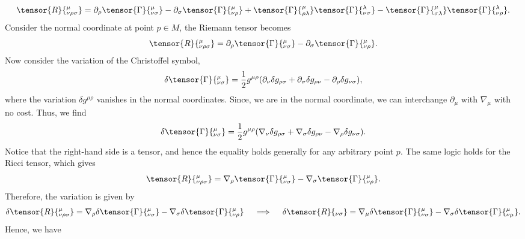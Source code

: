 \begin{solution}
    \begin{equation}
        \tensor{R}{^\mu_{\nu\rho\sigma}} = \partial_\rho\tensor{\Gamma}{^\mu_{\nu\sigma}}
    - \partial_\sigma\tensor{\Gamma}{^\mu_{\nu\rho}}
    + \tensor{\Gamma}{^\mu_{\rho\lambda}}\tensor{\Gamma}{^\lambda_{\nu\sigma}}
    - \tensor{\Gamma}{^\mu_{\sigma\lambda}}\tensor{\Gamma}{^\lambda_{\nu\rho}}.
    \end{equation}
    Consider the normal coordinate at point $p\in M$, the Riemann tensor becomes
    \begin{equation}
        \tensor{R}{^\mu_{\nu\rho\sigma}} = \partial_\rho\tensor{\Gamma}{^\mu_{\nu\sigma}}
    - \partial_\sigma\tensor{\Gamma}{^\mu_{\nu\rho}}.
    \end{equation}
    Now consider the variation of the Christoffel symbol, 
    \begin{equation}
        \delta \tensor{\Gamma}{^\mu_{\nu\sigma}} = \frac{1}{2}g^{\mu\rho}(\partial_\nu\delta g_{\rho\sigma} +\partial_\sigma\delta g_{\rho\nu} - \partial_\rho\delta g_{\nu\sigma}),
    \end{equation}
    where the variation $\delta g^{\mu\rho}$ vanishes in the normal coordinates. Since, we are in the normal coordinate, we can interchange $\partial_\mu$ with $\nabla_\mu$ with no cost. Thus, we find
    \begin{equation}
        \delta \tensor{\Gamma}{^\mu_{\nu\sigma}} = \frac{1}{2}g^{\mu\rho}(\nabla_\nu\delta g_{\rho\sigma} +\nabla_\sigma\delta g_{\rho\nu} - \nabla_\rho\delta g_{\nu\sigma}).
    \end{equation}
    Notice that the right-hand side is a tensor, and hence the equality holds generally for any arbitrary point $p$. The same logic holds for the Ricci tensor, which gives
    \begin{equation}
        \tensor{R}{^\mu_{\nu\rho\sigma}} = \nabla_\rho\tensor{\Gamma}{^\mu_{\nu\sigma}}
    - \nabla_\sigma\tensor{\Gamma}{^\mu_{\nu\rho}}.
    \end{equation}
    Therefore, the variation is given by
    \begin{equation}
        \delta\tensor{R}{^\mu_{\nu\rho\sigma}} = \nabla_\rho\delta\tensor{\Gamma}{^\mu_{\nu\sigma}}
    - \nabla_\sigma\delta\tensor{\Gamma}{^\mu_{\nu\rho}} \quad\implies\quad \delta\tensor{R}{_{\nu\sigma}} = \nabla_\mu\delta\tensor{\Gamma}{^\mu_{\nu\sigma}}
    - \nabla_\sigma\delta\tensor{\Gamma}{^\mu_{\nu\mu}}.
    \end{equation}
    Hence, we have
    \begin{equation}

\end{equation}
\end{solution}
